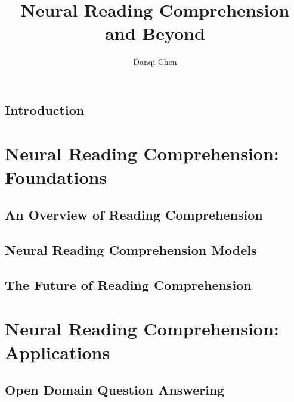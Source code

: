 \documentclass[12pt]{report}
\begin{document}
\title{Neural Reading Comprehension and Beyond}
\author{Danqi Chen}

\beforepreface


\afterpreface
\hypersetup{linkcolor=magenta}


\chapter{Introduction}
\label{chapter:intro}


\part{Neural Reading Comprehension: Foundations}

\chapter{An Overview of Reading Comprehension}
\label{chapter:rc-overview}





\chapter{Neural Reading Comprehension Models}
\label{chapter:rc-models}






\chapter{The Future of Reading Comprehension}
\label{chapter:rc-future}





\part{Neural Reading Comprehension: Applications}

\chapter{Open Domain Question Answering}
\label{chapter:openqa}





% 
\end{document}
